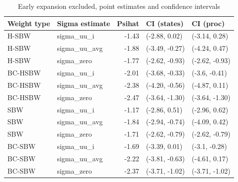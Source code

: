 \documentclass[aoas]{imsart}
\theoremstyle{plain}
\theoremstyle{remark}
\begin{document}
\begin{appendix}
\begin{table}[ht]
\centering
\caption{Early expansion excluded, point estimates and confidence intervals}
\label{tab:confintmainc2}
\begin{tabular}{llrll}
  \hline
Weight type & Sigma estimate & Psihat & CI (states) & CI (proc) \\ 
  \hline
H-SBW & sigma\_uu\_i & -1.43 & (-2.88, 0.02) & (-3.14, 0.28) \\ 
  H-SBW & sigma\_uu\_avg & -1.88 & (-3.49, -0.27) & (-4.24, 0.47) \\ 
  H-SBW & sigma\_zero & -1.77 & (-2.62, -0.93) & (-2.62, -0.93) \\ 
  BC-HSBW & sigma\_uu\_i & -2.01 & (-3.68, -0.33) & (-3.6, -0.41) \\ 
  BC-HSBW & sigma\_uu\_avg & -2.38 & (-4.20, -0.56) & (-4.87, 0.11) \\ 
  BC-HSBW & sigma\_zero & -2.47 & (-3.64, -1.30) & (-3.64, -1.30) \\ 
  SBW & sigma\_uu\_i & -1.17 & (-2.86, 0.51) & (-2.96, 0.62) \\ 
  SBW & sigma\_uu\_avg & -1.84 & (-2.94, -0.74) & (-4.09, 0.42) \\ 
  SBW & sigma\_zero & -1.71 & (-2.62, -0.79) & (-2.62, -0.79) \\ 
  BC-SBW & sigma\_uu\_i & -1.69 & (-3.39, 0.01) & (-3.1, -0.28) \\ 
  BC-SBW & sigma\_uu\_avg & -2.22 & (-3.81, -0.63) & (-4.61, 0.17) \\ 
  BC-SBW & sigma\_zero & -2.37 & (-3.71, -1.02) & (-3.71, -1.02) \\ 
   \hline
\end{tabular}
\end{table}


\end{appendix}
\end{document}
